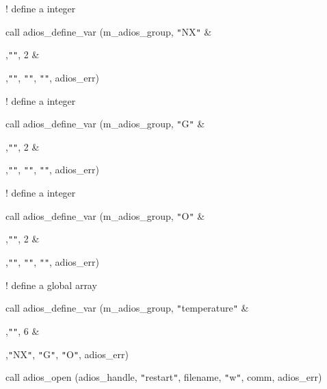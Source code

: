 \vspace{22pt}
! define a integer

\vspace{10pt}
\parindent=28pt
call adios\_define\_var (m\_adios\_group, \texttt{"}NX\texttt{"} \&

\vspace{10pt}
\parindent=93pt
,\texttt{"}\texttt{"}, 2 \&

\vspace{10pt}
,\texttt{"}\texttt{"}, \texttt{"}\texttt{"}, \texttt{"}\texttt{"}, adios\_err)

\vspace{10pt}
\parindent=108pt
! define a integer

\vspace{10pt}
\parindent=14pt
call adios\_define\_var (m\_adios\_group, \texttt{"}G\texttt{"} \&

\vspace{10pt}
\parindent=93pt
,\texttt{"}\texttt{"}, 2 \&

\vspace{10pt}
,\texttt{"}\texttt{"}, \texttt{"}\texttt{"}, \texttt{"}\texttt{"}, adios\_err)

\vspace{10pt}
\parindent=108pt
! define a integer

\vspace{10pt}
\parindent=14pt
call adios\_define\_var (m\_adios\_group, \texttt{"}O\texttt{"} \&

\vspace{10pt}
\parindent=93pt
,\texttt{"}\texttt{"}, 2 \&

\vspace{10pt}
,\texttt{"}\texttt{"}, \texttt{"}\texttt{"}, \texttt{"}\texttt{"}, adios\_err)

\vspace{10pt}
\parindent=108pt
! define a global array

\vspace{10pt}
\parindent=14pt
call adios\_define\_var (m\_adios\_group, \texttt{"}temperature\texttt{"} \&

\vspace{10pt}
\parindent=93pt
,\texttt{"}\texttt{"}, 6 \&

\vspace{10pt}
,\texttt{"}NX\texttt{"}, \texttt{"}G\texttt{"}, \texttt{"}O\texttt{"}, adios\_err)

\vspace{22pt}
\parindent=108pt
call adios\_open (adios\_handle, \texttt{"}restart\texttt{"}, filename, \texttt{"}w\texttt{"}, 
comm, adios\_err)

